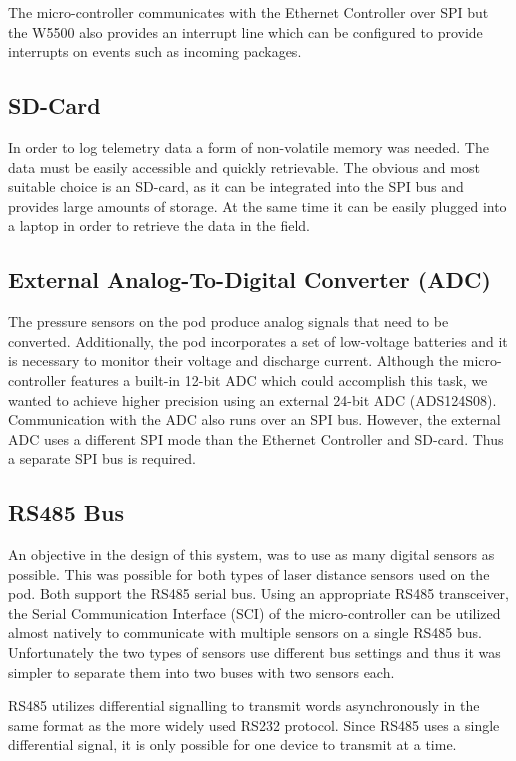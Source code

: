 The micro-controller communicates with the Ethernet Controller over SPI but the W5500 also provides an interrupt line which can be configured to provide interrupts on events such as incoming packages.

\subsection{SD-Card}

In order to log telemetry data a form of non-volatile memory was needed. The data must be easily accessible and quickly retrievable. The obvious and most suitable choice is an SD-card, as it can be integrated into the SPI bus and provides large amounts of storage. At the same time it can be easily plugged into a laptop in order to retrieve the data in the field.

\subsection{External Analog-To-Digital Converter (ADC)}

The pressure sensors on the pod produce analog signals that need to be converted. Additionally, the pod incorporates a set of low-voltage batteries and it is necessary to monitor their voltage and discharge current. Although the micro-controller features a built-in 12-bit ADC which could accomplish this task, we wanted to achieve higher precision using an external 24-bit ADC (ADS124S08). Communication with the ADC also runs over an SPI bus. However, the external ADC uses a different SPI mode than the Ethernet Controller and SD-card. Thus a separate SPI bus is required.

\subsection{RS485 Bus}

An objective in the design of this system, was to use as many digital sensors as possible. This was possible for both types of laser distance sensors used on the pod. Both support the RS485 serial bus. Using an appropriate RS485 transceiver, the Serial Communication Interface (SCI) of the micro-controller can be utilized almost natively to communicate with multiple sensors on a single RS485 bus. Unfortunately the two types of sensors use different bus settings and thus it was simpler to separate them into two buses with two sensors each.

RS485 utilizes differential signalling to transmit words asynchronously in the same format as the more widely used RS232 protocol. Since RS485 uses a single differential signal, it is only possible for one device to transmit at a time.

